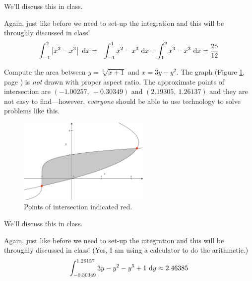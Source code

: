 \documentclass[12pt,addpoints, answers, fleqn]{exam}
\begin{document}
\begin{questions}
\begin{solution}
We'll discuss this in class.

 Again, just like before we need to set-up the integration and this will be throughly discussed in class!
\begin{eqnarray*}
 \int_{-1}^{2} \left| x^2-x^3\right| \ {\rm{d}} x &=& \int_{-1}^{1}  x^2-x^3 \ {\rm{d}} x + \int_{1}^{2} x^3-x^2 \ {\rm{d}} x =  \frac{25}{12}
\end{eqnarray*}
\end{solution}

\question Compute the area between $y=\sqrt[5]{x+1}$ and $x=3y-y^2$. The graph (Figure \ref{fig:graph3107}, page \pageref{fig:graph3107}) is \emph{not} drawn with proper aspect ratio. The approximate points of intersection are $\left( -1.00257, \ -0.30349\right)$ and $\left( 2.19305, \ 1.26137 \right)$ and they are not easy to find---however, \emph{everyone} should be able to use technology to solve problems like this.
\begin{figure}[htbp] %
   \centering
   \includegraphics[width=2.5in]{./graphics/graph3107.pdf} 
   \caption{Points of intersection indicated red.}
   \label{fig:graph3107}
\end{figure}

\begin{solution}
We'll discuss this in class.

Again, just like before we need to set-up the integration and this will be throughly discussed in class! (Yes, I am using a calculator to do the arithmetic.)
\begin{eqnarray*}
 \int_{-0.30349}^{1.26137} 3y - y^2- y^5 + 1 \ {\rm{d}} y \approx 2.46385
\end{eqnarray*}
\end{solution}


\end{questions}
\end{document}
